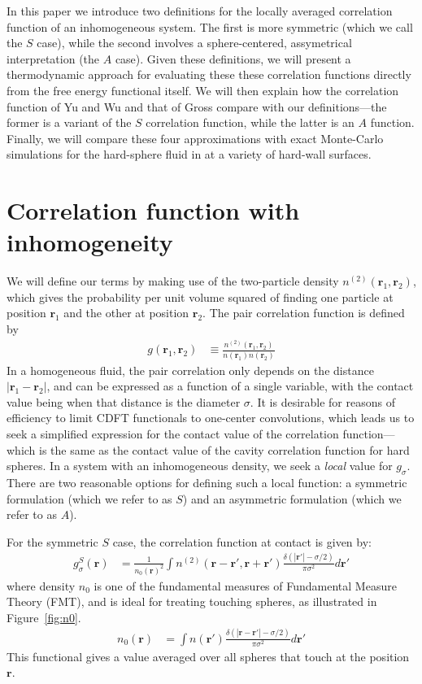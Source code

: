 \documentclass[letterpaper,twocolumn,amsmath,amssymb,jcp,10pt,aip]{revtex4-1}
\newcommand{\rr}{\textbf{r}}
\begin{document}
In this paper we introduce two definitions for the locally averaged
correlation function of an inhomogeneous system.  The first is more
symmetric (which we call the $S$ case), while the second involves a
sphere-centered, assymetrical interpretation (the $A$ case).  Given
these definitions, we will present a thermodynamic approach for
evaluating these these correlation functions directly from the free
energy functional itself.  We will then explain how the correlation
function of Yu and Wu and that of Gross compare with our
definitions---the former is a variant of the $S$ correlation function,
while the latter is an $A$ function.  Finally, we will compare these
four approximations with exact Monte-Carlo simulations for the
hard-sphere fluid in at a variety of hard-wall surfaces.


\section{Correlation function with inhomogeneity}

We will define our terms by making use of the two-particle density
$n^{(2)}(\rr_1,\rr_2)$, which gives the probability per unit volume
squared of finding one particle at position $\rr_1$ and the other at
position $\rr_2$.  The pair correlation function is defined by
\begin{align}
  g(\rr_1,\rr_2) &\equiv \frac{n^{(2)}(\rr_1,\rr_2)}{n(\rr_1)n(\rr_2)}
\end{align}
In a homogeneous fluid, the pair correlation only depends on the
distance $|\rr_1-\rr_2|$, and can be expressed as a function of a
single variable, with the contact value being when that distance is
the diameter $\sigma$.  It is desirable for reasons of efficiency to limit CDFT
functionals to one-center convolutions, which leads us to seek a
simplified expression for the contact value of the correlation
function---which is the same as the contact value of the cavity
correlation function for hard spheres.
In a system with an inhomogeneous density, we seek a \emph{local}
value for $g_\sigma$.  There are two reasonable options for defining
such a local function: a symmetric formulation (which we refer to as $S$) and an
asymmetric formulation (which we refer to as $A$).

For the symmetric $S$ case, the correlation function at contact is
given by:
\begin{align}
  g^S_\sigma(\rr) &= \frac{1}{n_0(\rr)^2}\int n^{(2)}(\rr - \rr', \rr
  + \rr')
  \frac{\delta(|\rr'| -\sigma/2)}{\pi\sigma^2}d\rr' \label{eq:gS}
\end{align}
where density $n_0$ is one of the fundamental measures of Fundamental
Measure Theory (FMT), and is ideal for treating touching spheres, as
illustrated in Figure~\ref{fig:n0}.
\begin{align}
  n_0(\rr) &= \int n(\rr')\frac{\delta(|\rr-\rr'|-\sigma/2)}{\pi\sigma^2} d\rr'
\end{align}
This functional gives a value averaged over all spheres that touch at
the position $\rr$.
\end{document}
